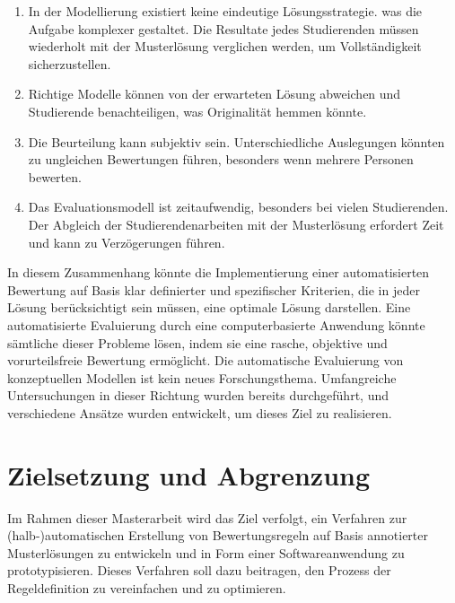 \begin{enumerate}
    \item In der Modellierung existiert keine eindeutige Lösungsstrategie. was die Aufgabe komplexer gestaltet. Die
    Resultate jedes Studierenden müssen wiederholt mit der Musterlösung verglichen werden, um Vollständigkeit sicherzustellen.

    \item Richtige Modelle können von der erwarteten Lösung abweichen und Studierende benachteiligen, was Originalität
    hemmen könnte.

    \item Die Beurteilung kann subjektiv sein. Unterschiedliche Auslegungen könnten zu ungleichen Bewertungen führen,
    besonders wenn mehrere Personen bewerten.

    \item Das Evaluationsmodell ist zeitaufwendig, besonders bei vielen Studierenden. Der Abgleich der Studierendenarbeiten
    mit der Musterlösung erfordert Zeit und kann zu Verzögerungen führen.

\end{enumerate}
    

In diesem Zusammenhang könnte die Implementierung einer automatisierten Bewertung auf Basis klar definierter und spezifischer Kriterien, die in jeder Lösung berücksichtigt sein müssen, eine optimale Lösung darstellen. Eine automatisierte Evaluierung durch eine computerbasierte Anwendung könnte sämtliche dieser Probleme lösen, indem sie eine rasche, objektive und vorurteilsfreie Bewertung ermöglicht. Die automatische Evaluierung von \gls{konzeptuellen Modellen} ist kein neues Forschungsthema. Umfangreiche Untersuchungen in dieser Richtung wurden bereits durchgeführt, und verschiedene Ansätze wurden entwickelt, um dieses Ziel zu realisieren.

\section{Zielsetzung und Abgrenzung}

Im Rahmen dieser Masterarbeit wird das Ziel verfolgt, ein Verfahren zur (halb-)automatischen Erstellung von Bewertungsregeln auf Basis annotierter Musterlösungen zu entwickeln und in Form einer Softwareanwendung zu prototypisieren. Dieses Verfahren soll dazu beitragen, den Prozess der Regeldefinition zu vereinfachen und zu optimieren.


